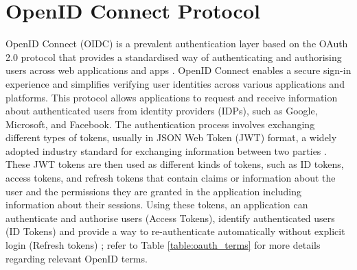 \section{OpenID Connect Protocol}
OpenID Connect (OIDC) is a prevalent authentication layer based on the OAuth 2.0 protocol that provides a standardised way of authenticating and authorising users across web applications and apps \citep{oidc_intro}. OpenID Connect enables a secure sign-in experience and simplifies verifying user identities across various applications and platforms. This protocol allows applications to request and receive information about authenticated users from identity providers (IDPs), such as Google, Microsoft, and Facebook. The authentication process involves exchanging different types of tokens, usually in JSON Web Token (JWT) format, a widely adopted industry standard for exchanging information between two parties \citep{jwt}. These JWT tokens are then used as different kinds of tokens, such as ID tokens, access tokens, and refresh tokens that contain claims or information about the user and the permissions they are granted in the application including information about their sessions. Using these tokens, an application can authenticate and authorise users (Access Tokens), identify authenticated users (ID Tokens) and provide a way to re-authenticate automatically without explicit login (Refresh tokens) \citep{oidc_tokens}; refer to Table \ref{table:oauth_terms} for more details regarding relevant OpenID terms.
\newpage
\begingroup
\centering
\setlength{\tabcolsep}{6.5pt} %
